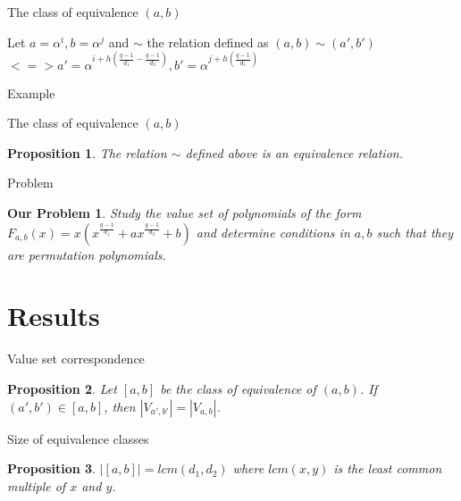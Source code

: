 \documentclass{beamer}
\newtheorem{proposition}{Proposition}
\newtheorem{ourproblem}{Our Problem}
\begin{document}
\begin{frame}{The class of equivalence $(a,b)$}
  
  Let $a = \alpha^i, b = \alpha^j$ and $\sim$ the relation defined as $(a,b) \sim (a', b')$ 
  $<=> a' = \alpha^{i+h(\frac{q-1}{d_1} - \frac{q-1}{d_2})}, b' = \alpha^{j+h(\frac{q-1}{d_1})}$

  \alert{Example}

\end{frame}

\begin{frame}{The class of equivalence $(a,b)$}
  
  \begin{proposition}
    The relation $\sim$ defined above is an equivalence relation.
  \end{proposition}

\end{frame}

\begin{frame}{Problem}
  \begin{ourproblem}
    Study the value set of polynomials of the form $F_{a,b}(x) = x(x^{\frac{q-1}{d_1}} + ax^{\frac{q-1}{d_2}} +b)$ and determine conditions in $a,b$ such that they are permutation polynomials.
  \end{ourproblem}
\end{frame}

\section{Results} %
\label{sec:results}

\begin{frame}{Value set correspondence}
  \begin{proposition}

    Let $[a, b]$ be the class of equivalence of $(a, b)$. If $(a', b') \in [a, b]$,
     then $|V_{a', b'}| = |V_{a, b}|$.

  \end{proposition}
\end{frame}

\begin{frame}{Size of equivalence classes}
  
  \begin{proposition}
    $|[a, b]| = lcm(d_1,d_2)$ where $lcm(x,y)$ is the least common multiple of $x$ and $y$.
  \end{proposition}
\end{frame}
\end{document}
